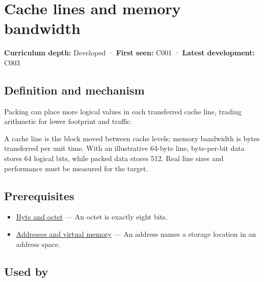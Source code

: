 \hypertarget{appendix-e4ccdbab8320}{}\label{referencestart:appendix-e4ccdbab8320}
\section{Cache lines and memory bandwidth}\label{appendix-e4ccdbab8320-cache-lines-and-memory-bandwidth}

\hypertarget{appendix-e4ccdbab8320-cache-lines-and-memory-bandwidth}{}

\textbf{Curriculum depth:} Developed · \textbf{First seen:} C001 · \textbf{Latest development:} C003

\begin{allmightroledefinition}

\subsection{Definition and mechanism}\label{appendix-e4ccdbab8320-definition-and-mechanism}

\hypertarget{appendix-e4ccdbab8320-definition-and-mechanism}{}

Packing can place more logical values in each transferred cache line, trading arithmetic for lower footprint and traffic.

\end{allmightroledefinition}

A cache line is the block moved between cache levels; memory bandwidth is bytes transferred per unit time. With an illustrative 64-byte line, byte-per-bit data stores 64 logical bits, while packed data stores 512. Real line sizes and performance must be measured for the target.

\subsection{Prerequisites}\label{appendix-e4ccdbab8320-prerequisites}

\hypertarget{appendix-e4ccdbab8320-prerequisites}{}

\begin{itemize}
\tightlist
\item
  \hyperref[appendix-5bee2df85484]{Byte and octet} --- An octet is exactly eight bits.
\item
  \hyperref[appendix-18ee4f913c3c]{Addresses and virtual memory} --- An address names a storage location in an address space.
\end{itemize}

\subsection{Used by}\label{appendix-e4ccdbab8320-used-by}

